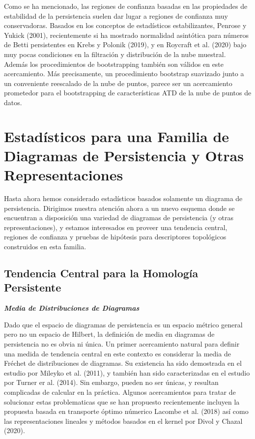 Como se ha mencionado, las regiones de confianza basadas en las propiedades de estabilidad
de la persistencia suelen dar lugar a regiones de confianza muy conservadoras.
Basados en los conceptos de estad\'isticos estabilizantes, Penrose y Yukick
(2001)\cite{PenroseYukich2001}, recientemente si ha mostrado normalidad asint\'otica para
n\'umeros de Betti persistentes en Krebs y Polonik (2019)\cite{KrebsPolonik2019},
y en Roycraft et al. (2020)\cite{Roycraft2020} bajo muy pocas condiciones en la filtraci\'on y
distribuci\'on de la nube muestral.
Adem\'as los procedimientos de bootstrapping tambi\'en son v\'alidos en este
acercamiento.
M\'as precisamente, un procedimiento bootstrap suavizado junto a un conveniente
reescalado de la nube de puntos, parece ser un acercamiento prometedor
para el bootstrapping de caracter\'isticas ATD de la nube de puntos de datos.

\section{Estad\'isticos para una Familia de Diagramas de Persistencia y Otras Representaciones}

Hasta ahora hemos considerado estad\'isticos basados solamente un diagrama de persistencia.
Dirigimos nuestra atenci\'on ahora a un nuevo esquema donde se encuentran a disposici\'on una
variedad de diagramas de persistencia (y otras representaciones),
y estamos interesados en proveer una tendencia central,
regiones de confianza y pruebas de hip\'otesis para descriptores topol\'ogicos
construidos en esta familia.

\subsection{Tendencia Central para la Homolog\'ia Persistente}

\textbf{\textit{\large Media de Distribuciones de Diagramas}}

Dado que el espacio de diagramas de persistencia es un espacio m\'etrico general pero no
un espacio de Hilbert, la definici\'on de media en diagramas de persistencia no es obvia ni
\'unica.
Un primer acercamiento natural para definir una medida de tendencia central en este contexto
es considerar la media de Fr\'echet de distribuciones de diagramas.
Su existencia ha sido demostrada en el estudio por Mileyko et al. (2011)\cite{Mileyko2011},
y tambi\'en han sido caracterizadas en el estudio por Turner er al. (2014)\cite{Turner2014a}.
Sin embargo, pueden no ser \'unicas, y resultan complicadas de calcular en la pr\'actica.
Algunos acercamientos para tratar de solucionar estas problematicas que se han propuesto
recientemente incluyen la propuesta basada en transporte \'optimo n\'umerico
Lacombe et al. (2018)\cite{Lacombe2018} as\'i como las representaciones lineales y m\'etodos
basados en el kernel por Divol y Chazal (2020)\cite{Divol2020}.\medbreak\medbreak

